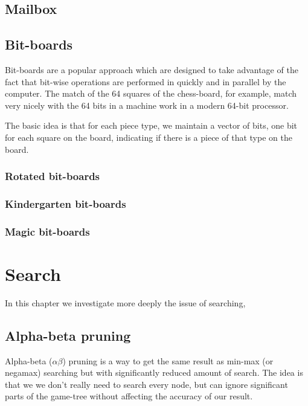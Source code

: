 \documentclass[10pt,dvipdfmx,letterpaper]{report}
\newcommand{\ab}{{$\alpha\beta$}}
\begin{document}
\section{Mailbox}

\section{Bit-boards}

Bit-boards are a popular approach which are designed to take advantage
of the fact that bit-wise operations are performed in quickly and in parallel
by the computer.  The match of the 64 squares of the chess-board, for example,
match very nicely with the 64 bits in a machine work in a modern 64-bit processor.

The basic idea is that for each piece type, we maintain a vector of bits, one bit
for each square on the board, indicating if there is a piece of that type on the
board.

\subsection{Rotated bit-boards}
\subsection{Kindergarten bit-boards}
\subsection{Magic bit-boards}


\chapter{Search}
\label{chap-search}

In this chapter we investigate more deeply the issue of searching,

\section{Alpha-beta pruning}
Alpha-beta (\ab) pruning is a way to get the same result
as min-max (or negamax) searching but with significantly reduced amount of search.
The idea is that we we don't really need to search every node, but can ignore significant
parts of the game-tree without affecting the accuracy of our result.
\end{document}
